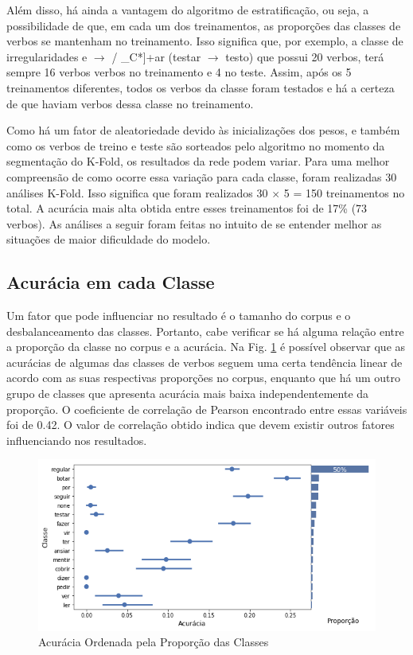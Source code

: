 

Além disso, há ainda a vantagem do algoritmo de estratificação, ou seja, a possibilidade de que, em cada um dos treinamentos, as proporções das classes de verbos se mantenham no treinamento. Isso significa que, por exemplo, a classe de irregularidades e $\rightarrow$ \textepsilon / \_C*]+ar (testar $\rightarrow$ testo) que possui 20 verbos, terá sempre 16 verbos verbos no treinamento e 4 no teste. Assim, após os 5 treinamentos diferentes, todos os verbos da classe foram testados e há a certeza de que haviam verbos dessa classe no treinamento. 

Como há um fator de aleatoriedade devido às inicializações dos pesos, e também como os verbos de treino e teste são sorteados pelo algoritmo no momento da segmentação do K-Fold, os resultados da rede podem variar. Para uma melhor compreensão de como ocorre essa variação para cada classe, foram realizadas 30 análises K-Fold. Isso significa que foram realizados 30 $\times$ 5 = 150 treinamentos no total.
A acurácia mais alta obtida entre esses treinamentos foi de 17\% (73 verbos). As análises a seguir foram feitas no intuito de se entender melhor as situações de maior dificuldade do modelo.

\subsection{Acurácia em cada Classe}
\label{sec:prop}

Um fator que pode influenciar no resultado é o tamanho do corpus e o desbalanceamento das classes. Portanto, cabe verificar se há alguma relação entre a proporção da classe no corpus e a acurácia. Na Fig. \ref{fig:kfoldprop} é possível observar que as acurácias de algumas das classes de verbos seguem uma certa tendência linear de acordo com as suas respectivas proporções no corpus, enquanto que há um outro grupo de classes que apresenta acurácia mais baixa independentemente da proporção. O coeficiente de correlação de Pearson encontrado entre essas variáveis foi de 0.42. O valor de correlação obtido indica que devem existir outros fatores influenciando nos resultados.

\begin{figure}[H]
  \centering
  \includegraphics[width=0.8\linewidth]{img/proporxacc.png}
  \caption{Acurácia Ordenada pela Proporção das Classes}
  \label{fig:kfoldprop}
\end{figure}

